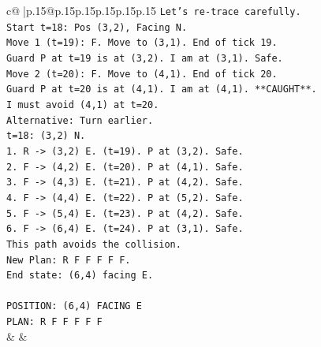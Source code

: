 \documentclass{article}
\begin{document}
{\begin{supertabular}{c@{$\;$}|p{.15\linewidth}@{}p{.15\linewidth}p{.15\linewidth}p{.15\linewidth}p{.15\linewidth}p{.15\linewidth}}
{{{\texttt{Let's re{-}trace carefully.} \\
\texttt{Start t=18: Pos (3,2), Facing N.} \\
\texttt{Move 1 (t=19): F. Move to (3,1). End of tick 19.} \\
\texttt{Guard P at t=19 is at (3,2). I am at (3,1). Safe.} \\
\texttt{Move 2 (t=20): F. Move to (4,1). End of tick 20.} \\
\texttt{Guard P at t=20 is at (4,1). I am at (4,1). **CAUGHT**.} \\
\texttt{I must avoid (4,1) at t=20.} \\
\texttt{Alternative: Turn earlier.} \\
\texttt{t=18: (3,2) N.} \\
\texttt{1. R {-}> (3,2) E. (t=19). P at (3,2). Safe.} \\
\texttt{2. F {-}> (4,2) E. (t=20). P at (4,1). Safe.} \\
\texttt{3. F {-}> (4,3) E. (t=21). P at (4,2). Safe.} \\
\texttt{4. F {-}> (4,4) E. (t=22). P at (5,2). Safe.} \\
\texttt{5. F {-}> (5,4) E. (t=23). P at (4,2). Safe.} \\
\texttt{6. F {-}> (6,4) E. (t=24). P at (3,1). Safe.} \\
\texttt{This path avoids the collision.} \\
\texttt{New Plan: R F F F F F.} \\
\texttt{End state: (6,4) facing E.} \\
\\ 
\texttt{POSITION: (6,4) FACING E} \\
\texttt{PLAN: R F F F F F} \\
            }
        }
    }
    & & \\ \\


\end{supertabular}}
\end{document}

